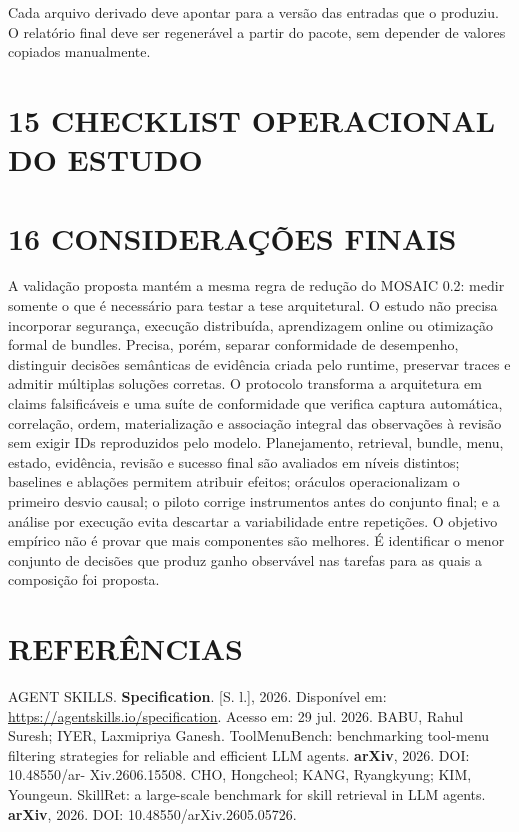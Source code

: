 \documentclass[12pt,a4paper]{article}
\begin{document}
Cada arquivo derivado deve apontar para a versão das entradas que o produziu. O relatório final deve ser regenerável a partir do pacote, sem depender de valores copiados manualmente.



\section*{15 CHECKLIST OPERACIONAL DO ESTUDO}



\section*{16 CONSIDERAÇÕES FINAIS}

A validação proposta mantém a mesma regra de redução do MOSAIC 0.2: medir somente o que é necessário para testar a tese arquitetural. O estudo não precisa incorporar segurança, execução distribuída, aprendizagem online ou otimização formal de bundles. Precisa, porém, separar conformidade de desempenho, distinguir decisões semânticas de evidência criada pelo runtime, preservar traces e admitir múltiplas soluções corretas. O protocolo transforma a arquitetura em claims falsificáveis e uma suíte de conformidade que verifica captura automática, correlação, ordem, materialização e associação integral das observações à revisão sem exigir IDs reproduzidos pelo modelo. Planejamento, retrieval, bundle, menu, estado, evidência, revisão e sucesso final são avaliados em níveis distintos; baselines e ablações permitem atribuir efeitos; oráculos operacionalizam o primeiro desvio causal; o piloto corrige instrumentos antes do conjunto final; e a análise por execução evita descartar a variabilidade entre repetições. O objetivo empírico não é provar que mais componentes são melhores. É identificar o menor conjunto de decisões que produz ganho observável nas tarefas para as quais a composição foi proposta.


\section*{REFERÊNCIAS}

AGENT SKILLS.\textbf{ Specification}. [S. l.], 2026. Disponível em: \url{https://agentskills.io/specification}. Acesso em: 29 jul. 2026. BABU, Rahul Suresh; IYER, Laxmipriya Ganesh. ToolMenuBench: benchmarking tool-menu filtering strategies for reliable and efficient LLM agents.\textbf{ arXiv}, 2026. DOI: 10.48550/ar- Xiv.2606.15508. CHO, Hongcheol; KANG, Ryangkyung; KIM, Youngeun. SkillRet: a large-scale benchmark for skill retrieval in LLM agents.\textbf{ arXiv}, 2026. DOI: 10.48550/arXiv.2605.05726.
\end{document}
